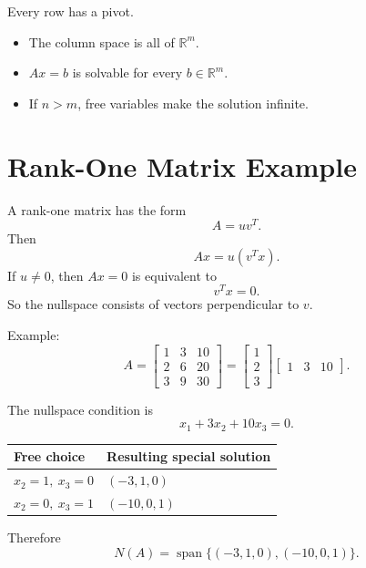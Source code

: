 \documentclass[10pt]{article}
\begin{document}
Every row has a pivot.
\begin{itemize}
  \item The column space is all of \(\mathbb{R}^m\).
  \item \(Ax=b\) is solvable for every \(b\in\mathbb{R}^m\).
  \item If \(n>m\), free variables make the solution infinite.
\end{itemize}


\section{Rank-One Matrix Example}

A rank-one matrix has the form
\[
A=uv^{T}.
\]
Then
\[
Ax=u(v^{T}x).
\]
If \(u\ne0\), then \(Ax=0\) is equivalent to
\[
v^{T}x=0.
\]
So the nullspace consists of vectors perpendicular to \(v\).

Example:
\[
A =
\begin{bmatrix}
1 & 3 & 10\\
2 & 6 & 20\\
3 & 9 & 30
\end{bmatrix}
=
\begin{bmatrix}
1\\
2\\
3
\end{bmatrix}
\begin{bmatrix}
1 & 3 & 10
\end{bmatrix}.
\]

The nullspace condition is
\[
x_1+3x_2+10x_3=0.
\]

\begin{center}
\small
\begin{tabularx}{0.72\linewidth}{@{}YY@{}}
\toprule
Free choice & Resulting special solution \\
\midrule
\(x_2=1,\ x_3=0\) & \((-3,1,0)\) \\
\(x_2=0,\ x_3=1\) & \((-10,0,1)\) \\
\bottomrule
\end{tabularx}
\end{center}

Therefore
\[
N(A)=\operatorname{span}\{(-3,1,0),(-10,0,1)\}.
\]

\end{document}
